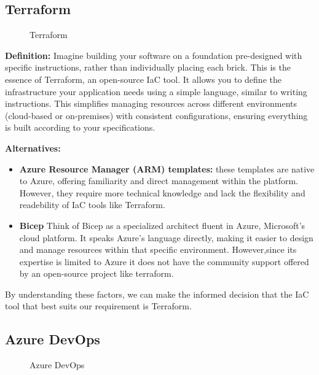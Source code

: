 \subsection*{Terraform}

\begin{figure}[htpb]
    \centering
    \caption{Terraform}
    \label{fig:terraform}
\end{figure}

\textbf{Definition:} Imagine building your software on a foundation pre-designed with specific instructions, rather than individually placing each brick. This is the essence of Terraform, an open-source IaC tool. It allows you to define the infrastructure your application needs using a simple language, similar to writing instructions. This simplifies managing resources across different environments (cloud-based or on-premises) with consistent configurations, ensuring everything is built according to your specifications.
\par
\textbf{Alternatives:} 
\begin{itemize}
    \item \textbf{Azure Resource Manager (ARM) templates:} these templates are native to Azure, offering familiarity and direct management within the platform. However, they require more technical knowledge and lack the flexibility and readebility of IaC tools like Terraform.
    \item \textbf{Bicep} Think of Bicep as a specialized architect fluent in Azure, Microsoft's cloud platform. It speaks Azure's language directly, making it easier to design and manage resources within that specific environment. However,since its expertise is limited to Azure it does not have the community support offered by an open-source project like terraform.
\end{itemize}
By understanding these factors, we can make the informed decision that the IaC tool that best suits our requirement is Terraform.
\subsection*{Azure DevOps}

\begin{figure}[htpb]
    \centering
    \caption{Azure DevOps}
    \label{fig:Azure_DevOps}
\end{figure}

